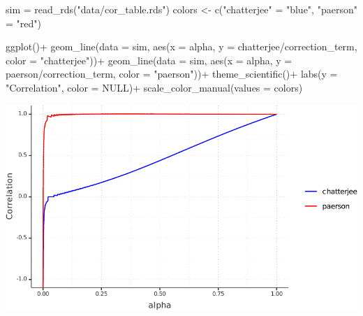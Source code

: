 \documentclass[
  10pt,
]{article}
\newenvironment{Shaded}{\begin{snugshade}}{\end{snugshade}}
\newcommand{\AttributeTok}[1]{\textcolor[rgb]{0.77,0.63,0.00}{#1}}
\newcommand{\ConstantTok}[1]{\textcolor[rgb]{0.00,0.00,0.00}{#1}}
\newcommand{\FunctionTok}[1]{\textcolor[rgb]{0.00,0.00,0.00}{#1}}
\newcommand{\NormalTok}[1]{#1}
\newcommand{\OtherTok}[1]{\textcolor[rgb]{0.56,0.35,0.01}{#1}}
\newcommand{\SpecialCharTok}[1]{\textcolor[rgb]{0.00,0.00,0.00}{#1}}
\newcommand{\StringTok}[1]{\textcolor[rgb]{0.31,0.60,0.02}{#1}}
\begin{document}
\begin{Shaded}
\begin{Highlighting}[]
\NormalTok{sim }\OtherTok{=} \FunctionTok{read\_rds}\NormalTok{(}\StringTok{"data/cor\_table.rds"}\NormalTok{)}
\NormalTok{colors }\OtherTok{\textless{}{-}} \FunctionTok{c}\NormalTok{(}\StringTok{"chatterjee"} \OtherTok{=} \StringTok{"blue"}\NormalTok{, }\StringTok{"paerson"} \OtherTok{=} \StringTok{"red"}\NormalTok{)}

\FunctionTok{ggplot}\NormalTok{()}\SpecialCharTok{+}
  \FunctionTok{geom\_line}\NormalTok{(}\AttributeTok{data =}\NormalTok{ sim, }\FunctionTok{aes}\NormalTok{(}\AttributeTok{x =}\NormalTok{ alpha, }\AttributeTok{y =}\NormalTok{ chatterjee}\SpecialCharTok{/}\NormalTok{correction\_term, }\AttributeTok{color =} \StringTok{"chatterjee"}\NormalTok{))}\SpecialCharTok{+}
  \FunctionTok{geom\_line}\NormalTok{(}\AttributeTok{data =}\NormalTok{ sim, }\FunctionTok{aes}\NormalTok{(}\AttributeTok{x =}\NormalTok{ alpha, }\AttributeTok{y =}\NormalTok{ paerson}\SpecialCharTok{/}\NormalTok{correction\_term, }\AttributeTok{color =} \StringTok{"paerson"}\NormalTok{))}\SpecialCharTok{+}
  \FunctionTok{theme\_scientific}\NormalTok{()}\SpecialCharTok{+}
  \FunctionTok{labs}\NormalTok{(}\AttributeTok{y =} \StringTok{"Correlation"}\NormalTok{, }\AttributeTok{color =} \ConstantTok{NULL}\NormalTok{)}\SpecialCharTok{+}
  \FunctionTok{scale\_color\_manual}\NormalTok{(}\AttributeTok{values =}\NormalTok{ colors)}
\end{Highlighting}
\end{Shaded}

\begin{center}\includegraphics[width=1\linewidth]{figure/unnamed-chunk-5-1} \end{center}
\end{document}
